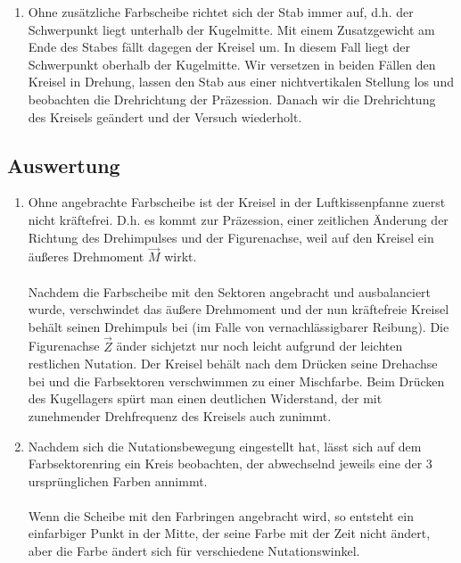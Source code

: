 \documentclass[a4paper,10pt]{article}
\begin{document}
\begin{enumerate}[label=(\alph*)]
\item Ohne zusätzliche Farbscheibe richtet sich der Stab immer auf, d.h.
der Schwerpunkt liegt unterhalb der Kugelmitte. Mit einem Zusatzgewicht am Ende des Stabes fällt dagegen der Kreisel um. In diesem Fall liegt der Schwerpunkt oberhalb der Kugelmitte. Wir versetzen in beiden Fällen den Kreisel in Drehung, lassen den Stab aus einer nichtvertikalen Stellung los und beobachten die Drehrichtung der Präzession. Danach  wir die Drehrichtung des Kreisels geändert und der Versuch wiederholt.
\end{enumerate}
\subsection{Auswertung}
\begin{enumerate}[label=(\alph*)]
\item Ohne angebrachte Farbscheibe ist der Kreisel in der Luftkissenpfanne zuerst nicht kräftefrei. D.h. es kommt zur Präzession, einer zeitlichen Änderung der Richtung des Drehimpulses und der Figurenachse, weil auf den Kreisel ein äußeres Drehmoment \(\vec{M}\) wirkt.\\\\
Nachdem die Farbscheibe mit den Sektoren angebracht und ausbalanciert wurde, verschwindet das äußere Drehmoment und der nun kräftefreie Kreisel behält seinen Drehimpuls bei (im Falle von vernachlässigbarer Reibung). Die Figurenachse  \(\vec{Z}\) änder sichjetzt nur noch leicht aufgrund der leichten restlichen Nutation.
Der Kreisel behält nach dem Drücken seine Drehachse bei und die Farbsektoren verschwimmen zu einer Mischfarbe. Beim Drücken des Kugellagers spürt man einen deutlichen Widerstand, der mit zunehmender Drehfrequenz des Kreisels auch zunimmt.

\item Nachdem sich die Nutationsbewegung eingestellt hat, lässt sich auf dem Farbsektorenring ein Kreis beobachten, der abwechselnd jeweils eine der 3 ursprünglichen Farben annimmt.\\\\
Wenn die Scheibe mit den Farbringen angebracht wird, so entsteht ein einfarbiger Punkt in der Mitte, der seine Farbe mit der Zeit nicht ändert, aber die Farbe ändert sich für verschiedene Nutationswinkel.


\end{enumerate}
\end{document}
